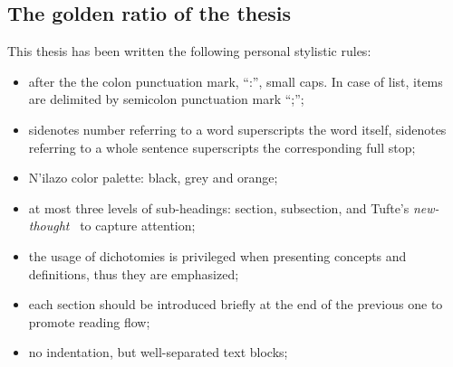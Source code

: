 \subsection{The golden ratio of the thesis}
This thesis has been written the following personal stylistic rules:
\begin{itemize}
    \item after the the colon punctuation mark, ``:'', small caps. In case of list, items are delimited by semicolon punctuation mark ``;'';
    \item sidenotes number referring to a word superscripts the word itself, sidenotes referring to a whole sentence superscripts the corresponding full stop;
    \item N'ilazo color palette: black, grey and orange;
    \item at most three levels of sub-headings: section, subsection, and Tufte's \textit{new-thought}~ to capture attention;
    \item the usage of dichotomies is privileged when presenting concepts and definitions, thus they are emphasized;
    \item each section should be introduced briefly at the end of the previous one to promote reading flow;
    \item no indentation, but well-separated text blocks;
\end{itemize}